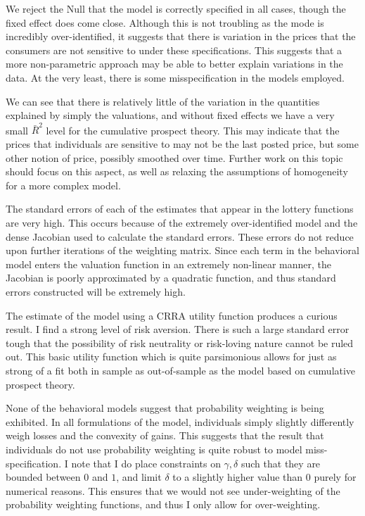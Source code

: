 \documentclass[12pt]{paper}
\begin{document}
\vspace{.2in}

We reject the Null that the model is correctly specified in all cases,
though the fixed effect does come close. Although this is not
troubling as the mode is incredibly over-identified, it suggests that
there is variation in the prices that the consumers are not sensitive
to under these specifications. This suggests that a more
non-parametric approach may be able to better explain variations in
the data. At the very least, there is some misspecification in the
models employed.

We can see that there is relatively little of the variation in the
quantities explained by simply the valuations, and without fixed
effects we have a very small $\bar{R}^2$ level for the cumulative
prospect theory. This may indicate that the prices that individuals
are sensitive to may not be the last posted price, but some other
notion of price, possibly smoothed over time. Further work on this
topic should focus on this aspect, as well as relaxing the
assumptions of homogeneity for a more complex model.

The standard errors of each of the estimates that appear in the
lottery functions are very high. This occurs because of the
extremely over-identified model and the dense Jacobian used to
calculate the standard errors. These errors do not reduce upon further
iterations of the weighting matrix. Since each term in the behavioral
model enters the valuation function in an extremely non-linear manner,
the Jacobian is poorly approximated by a quadratic function, and thus
standard errors constructed will be extremely high. 

The estimate of the model using a CRRA utility function produces a
curious result. I find a strong level of risk aversion. There
is such a large standard error tough that the possibility of risk
neutrality or risk-loving nature cannot be ruled out. This basic
utility function which is quite parsimonious allows for just as
strong of a fit both in sample as out-of-sample as the model based on
cumulative prospect theory.

None of the behavioral models suggest that probability weighting is
being exhibited. In all formulations of the model, individuals simply
slightly differently weigh losses and the convexity of gains. This
suggests that the result that individuals do not use probability
weighting is quite robust to model miss-specification. I note that I
do place constraints on $\gamma,\delta$ such that they are bounded between $0$
and $1$, and limit $\delta$ to a slightly higher value than $0$ purely for
numerical reasons. This ensures that we would not see under-weighting
of the probability weighting functions, and thus I only allow for
over-weighting.
\end{document}
